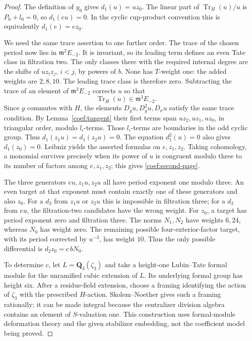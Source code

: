 \documentclass[11pt]{article}
\theoremstyle{definition}
\theoremstyle{remark}
\numberwithin{equation}{section}
\begin{document}
\begin{proof}
The definition of \(y_0\) gives \(d_1(u)=uz_0\).  The linear part of
\(\operatorname{Tr}_H(u)/u\) is \(P_0+l_0=0\), so \(d_1(eu)=0\).  In the cyclic
cup-product convention this is equivalently \(d_1(e)=ez_0\).

We need the same trace assertion to one further order.  The trace of
the chosen period now lies in \(\mathfrak m^2E_{-2}\).  It is invariant, so its
leading term defines an even Tate class in filtration two.  The only
classes there with the required internal degree are the shifts of
\(uz_i z_j\), \(i<j\), by powers of \(b\).  None has \(T\)-weight one:
the added weights are \(2,8,10\).  The leading trace class is therefore
zero.  Subtracting the trace of an element of \(\mathfrak m^2E_{-2}\) corrects
\(u\) so that
\[
 \operatorname{Tr}_H(u)\in\mathfrak m^3E_{-2}.
\]
Since \(g\) commutes with \(H\), the elements \(D_g u,D_g^2u,D_\sigma u\)
satisfy the same trace condition.  By
Lemma~\ref{coef:tangent} their first terms span
\(uz_2,uz_1,uz_0\), in triangular order, modulo \(l_i\)-terms.
Those \(l_i\)-terms are boundaries in the odd cyclic group.
Thus \(d_1(z_1u)=d_1(z_2u)=0\).  The equation \(d_1^2(u)=0\)
also gives \(d_1(z_0)=0\).
Leibniz yields the asserted formulas on \(e,z_1,z_2\).
Taking cohomology, a monomial survives precisely when its power of
\(u\) is congruent modulo three to its number of factors among
\(e,z_1,z_2\); this gives \eqref{coef:second-page}.

The three generators \(eu,z_1u,z_2u\) all have period exponent one
modulo three.  An even target at that exponent must contain exactly
one of these generators and also \(z_0\).  For a \(d_2\) from \(z_1u\)
or \(z_2u\) this is impossible in filtration three; for a \(d_2\) from
\(eu\), the filtration-two candidates have the wrong weight.
For \(z_0\), a target has period exponent zero and filtration three.
The norms \(N_1,N_2\) have weights \(6,24\), whereas \(N_0\) has
weight zero.  The remaining possible four-exterior-factor target,
with its period corrected by \(u^{-3}\), has weight \(10\).
Thus the only possible differential is \(d_2z_0=c\,bN_0\).

To determine \(c\), let \(L=\mathbf Q_3(\zeta_3)\) and take a height-one
Lubin--Tate formal module for the unramified cubic extension of \(L\).
Its underlying formal group has height six.  After a residue-field
extension, choose a framing identifying the action of \(\zeta_3\)
with the prescribed \(H\)-action.  Skolem--Noether gives such a
framing rationally; it can be made integral because the centralizer
division algebra contains an element of \(S\)-valuation one.
This construction uses formal-module deformation theory and the
given stabilizer embedding, not the coefficient model being proved.


\end{proof}
\end{document}
